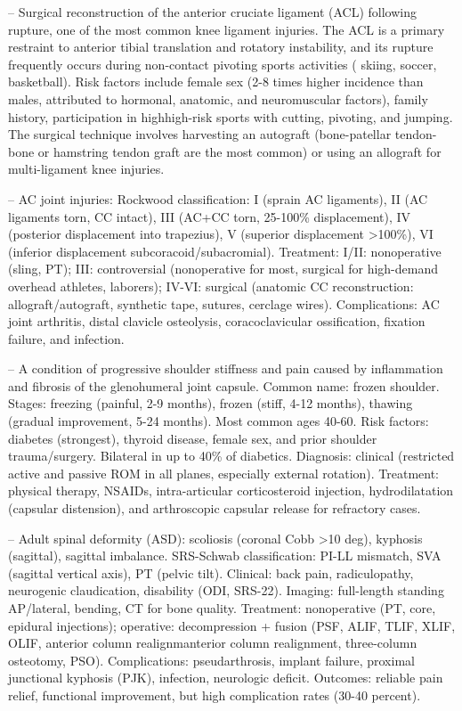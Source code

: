 -- Surgical reconstruction of the anterior cruciate ligament (ACL) following rupture, one of the most common knee ligament injuries. The ACL is a primary restraint to anterior tibial translation and rotatory instability, and its rupture frequently occurs during non-contact pivoting sports activities ( skiing, soccer, basketball). Risk factors include female sex (2-8 times higher incidence than males, attributed to hormonal, anatomic, and neuromuscular factors), family history, participation in highhigh-risk sports with cutting, pivoting, and jumping. The surgical technique involves harvesting an autograft (bone-patellar tendon-bone or hamstring tendon graft are the most common) or using an allograft for multi-ligament knee injuries.

-- AC joint injuries: Rockwood classification: I (sprain AC ligaments), II (AC ligaments torn, CC intact), III (AC+CC torn, 25-100\% displacement), IV (posterior displacement into trapezius), V (superior displacement >100\%), VI (inferior displacement subcoracoid/subacromial). Treatment: I/II: nonoperative (sling, PT); III: controversial (nonoperative for most, surgical for high-demand overhead athletes, laborers); IV-VI: surgical (anatomic CC reconstruction: allograft/autograft, synthetic tape, sutures, cerclage wires). Complications: AC joint arthritis, distal clavicle osteolysis, coracoclavicular ossification, fixation failure, and infection.

-- A condition of progressive shoulder stiffness and pain caused by inflammation and fibrosis of the glenohumeral joint capsule. Common name: frozen shoulder. Stages: freezing (painful, 2-9 months), frozen (stiff, 4-12 months), thawing (gradual improvement, 5-24 months). Most common ages 40-60. Risk factors: diabetes (strongest), thyroid disease, female sex, and prior shoulder trauma/surgery. Bilateral in up to 40\% of diabetics. Diagnosis: clinical (restricted active and passive ROM in all planes, especially external rotation). Treatment: physical therapy, NSAIDs, intra-articular corticosteroid injection, hydrodilatation (capsular distension), and arthroscopic capsular release for refractory cases.

-- Adult spinal deformity (ASD): scoliosis (coronal Cobb >10 deg), kyphosis (sagittal), sagittal imbalance. SRS-Schwab classification: PI-LL mismatch, SVA (sagittal vertical axis), PT (pelvic tilt). Clinical: back pain, radiculopathy, neurogenic claudication, disability (ODI, SRS-22). Imaging: full-length standing AP/lateral, bending, CT for bone quality. Treatment: nonoperative (PT, core, epidural injections); operative: decompression + fusion (PSF, ALIF, TLIF, XLIF, OLIF, anterior column realignmanterior column realignment, three-column osteotomy, PSO). Complications: pseudarthrosis, implant failure, proximal junctional kyphosis (PJK), infection, neurologic deficit. Outcomes: reliable pain relief, functional improvement, but high complication rates (30-40 percent).

